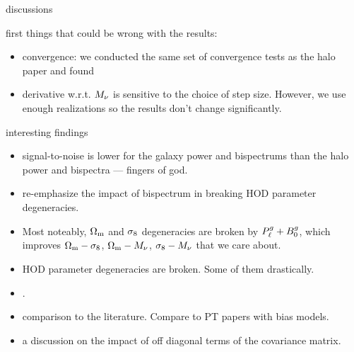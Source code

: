 discussions

first things that could be wrong with the results: 
\begin{itemize}
    \item convergence: we conducted the same set of convergence tests as the halo paper and
        found  
    \item derivative w.r.t. $M_\nu$ is sensitive to the choice of step size.
        However, we use enough realizations so the results don't change
        significantly.  
\end{itemize}

interesting findings 
\begin{itemize}
    \item signal-to-noise is lower for the galaxy power and bispectrums than
        the halo power and bispectra --- fingers of god. 
    \item re-emphasize the impact of bispectrum in breaking HOD parameter
        degeneracies. 
    \item Most noteably, $\Omega_{\rm m}$ and $\sigma_8$ degeneracies are broken by
        $P^g_{\ell} + B^g_0$, which improves $\Omega_{\rm m} - \sigma_8$, $\Omega_{\rm m} - M_\nu$,
        $\sigma_8-M_\nu$ that we care about. 
    \item HOD parameter degeneracies are broken. Some of them drastically.
    \item {}.
\end{itemize}

\begin{itemize}
    \item comparison to the literature. Compare to PT papers with bias models. 
    \item a discussion on the impact of off diagonal terms of the covariance
        matrix. 
\end{itemize} 

